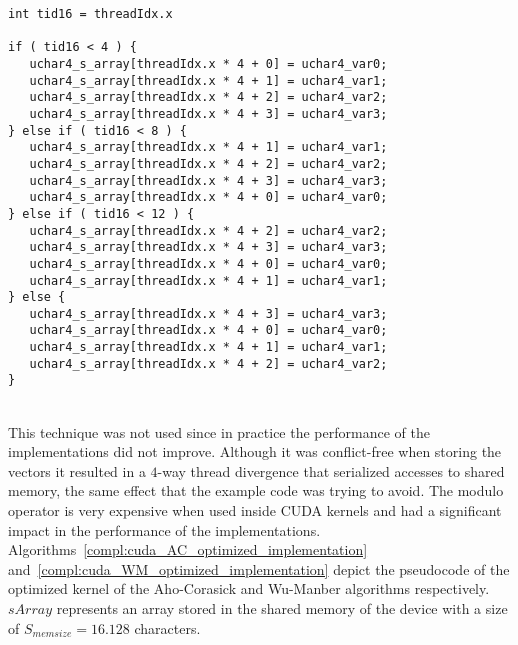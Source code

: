 \documentclass{ws-ijait}
\begin{document}
\noindent\begin{minipage}{\textwidth}
\begin{lstlisting}
int tid16 = threadIdx.x 

if ( tid16 < 4 ) {
   uchar4_s_array[threadIdx.x * 4 + 0] = uchar4_var0;
   uchar4_s_array[threadIdx.x * 4 + 1] = uchar4_var1;
   uchar4_s_array[threadIdx.x * 4 + 2] = uchar4_var2;
   uchar4_s_array[threadIdx.x * 4 + 3] = uchar4_var3;
} else if ( tid16 < 8 ) {
   uchar4_s_array[threadIdx.x * 4 + 1] = uchar4_var1;
   uchar4_s_array[threadIdx.x * 4 + 2] = uchar4_var2;
   uchar4_s_array[threadIdx.x * 4 + 3] = uchar4_var3;
   uchar4_s_array[threadIdx.x * 4 + 0] = uchar4_var0;
} else if ( tid16 < 12 ) {
   uchar4_s_array[threadIdx.x * 4 + 2] = uchar4_var2;
   uchar4_s_array[threadIdx.x * 4 + 3] = uchar4_var3;
   uchar4_s_array[threadIdx.x * 4 + 0] = uchar4_var0;
   uchar4_s_array[threadIdx.x * 4 + 1] = uchar4_var1;
} else {
   uchar4_s_array[threadIdx.x * 4 + 3] = uchar4_var3;
   uchar4_s_array[threadIdx.x * 4 + 0] = uchar4_var0;
   uchar4_s_array[threadIdx.x * 4 + 1] = uchar4_var1;
   uchar4_s_array[threadIdx.x * 4 + 2] = uchar4_var2;
}		
\end{lstlisting}
\end{minipage}\\

This technique was not used since in practice the performance of the implementations did not improve. Although it was conflict-free when storing the vectors it resulted in a $4$-way thread divergence that serialized accesses to shared memory, the same effect that the example code was trying to avoid. The modulo operator is very expensive when used inside CUDA kernels and had a significant impact in the performance of the implementations. Algorithms~\ref{compl:cuda_AC_optimized_implementation} and~\ref{compl:cuda_WM_optimized_implementation} depict the pseudocode of the optimized kernel of the Aho-Corasick and Wu-Manber algorithms respectively. $sArray$ represents an array stored in the shared memory of the device with a size of $S_{memsize} = 16.128$ characters.
\end{document}
